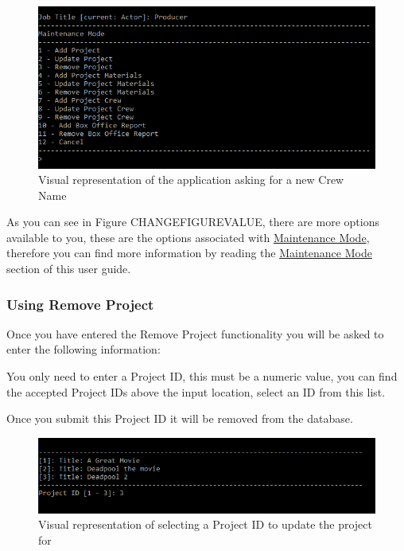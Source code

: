 \documentclass[
  english,
  a4paper,
,tablecaptionabove
]{scrartcl}
\begin{document}
\begin{figure}
\centering
\includegraphics{images/user-guide/maintenance-mode/update-crew-job-title.png}
\caption{Visual representation of the application asking for a new Crew
Name}
\end{figure}

As you can see in Figure CHANGEFIGUREVALUE, there are more options
available to you, these are the options associated with
\protect\hyperlink{using-maintenance-mode}{Maintenance Mode}, therefore
you can find more information by reading the
\protect\hyperlink{using-maintenance-mode}{Maintenance Mode} section of
this user guide.

\newpage

\hypertarget{using-remove-project}{%
\subsubsection{Using Remove Project}\label{using-remove-project}}

Once you have entered the Remove Project functionality you will be asked
to enter the following information:

You only need to enter a Project ID, this must be a numeric value, you
can find the accepted Project IDs above the input location, select an ID
from this list.

Once you submit this Project ID it will be removed from the database.

\begin{figure}
\centering
\includegraphics{images/user-guide/maintenance-mode/remove-project-select-id.png}
\caption{Visual representation of selecting a Project ID to update the
project for}
\end{figure}
\end{document}

